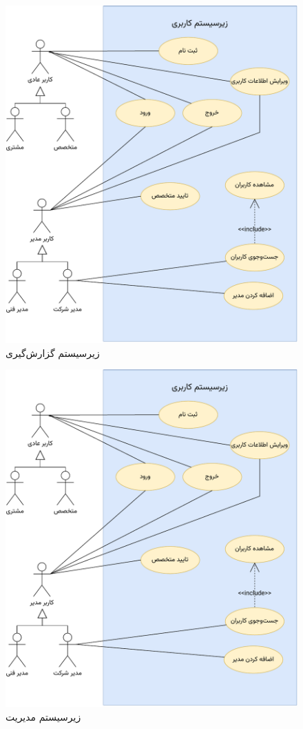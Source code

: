 \begin{figure}
\centering
	\includegraphics[scale=0.9, page=4]{figs/usecase.pdf}
\caption{زیرسیستم گزارش‌گیری}
\end{figure}
\FloatBarrier
\newpage

\begin{figure}
	\centering
	\includegraphics[scale=0.9, page=5]{figs/usecase.pdf}
	\caption{زیرسیستم مدیریت}
\end{figure}
\FloatBarrier
\newpage


